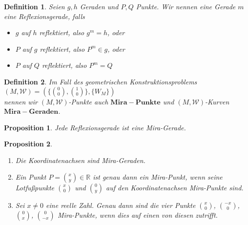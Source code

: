 \documentclass{scrbook}
\newtheorem{definition}{Definition}
\newtheorem{proposition}{Proposition}
\begin{document}
\begin{definition}
    \label{Reflexionsgerade}
    Seien $g, h$ Geraden und $P, Q$ Punkte. Wir nennen eine Gerade $m$ eine Reflexionsgerade, falls
    \begin{itemize}
        \item $g$ auf $h$ reflektiert, also $g^m=h$, oder
        \item $P$ auf $g$ reflektiert, also $P^m \in g$, oder
        \item $P$ auf $Q$ reflektiert, also $P^m = Q$
    \end{itemize}
    
\end{definition}

\begin{definition}
    Im Fall des geometrischen Konstruktionsproblems \\
    $ (M,\mathcal{W}) = (\{\binom{0}{0},\binom{1}{0} \}, \{ W_M\}) $ \\
    nennen wir $(M,\mathcal{W})$-Punkte auch $\mathbf{Mira-Punkte}$ und $(M,\mathcal{W})$-Kurven $\mathbf{Mira-Geraden}$.
\end{definition}

\begin{proposition}
    Jede Reflexionsgerade ist eine Mira-Gerade.
\end{proposition}
 
\begin{proposition}
    \label{Mira-Geraden-Beispiele}
    \begin{enumerate}[label=(\alph*)]
        \item Die Koordinatenachsen sind Mira-Geraden.
        \item Ein Punkt $P = \binom{x}{y} \in \mathbb{R}$ ist genau dann ein Mira-Punkt, wenn seine Lotfußpunkte $\binom{x}{0}$ und $\binom{0}{y}$ auf den Koordinatenachsen Mira-Punkte sind.
        \item Sei $x \neq 0$ eine reelle Zahl. Genau dann sind die vier Punkte $\binom{x}{0}$, $\binom{-x}{0}$, $\binom{0}{x}$, $\binom{0}{-x}$ Mira-Punkte, wenn dies auf einen von diesen zutrifft.
    \end{enumerate}
\end{proposition}
\end{document}
